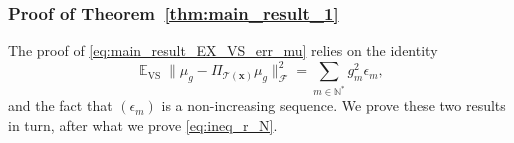 \documentclass[twoside,11pt]{book}
\numberwithin{theorem}{chapter}
\numberwithin{definition}{chapter}
\numberwithin{proposition}{chapter}
\numberwithin{corollary}{chapter}
\numberwithin{example}{chapter}
\numberwithin{lemma}{chapter}
\DeclareMathOperator{\VS}{\mathrm{VS}}
\DeclareMathOperator{\Tran}{\intercal}
\DeclareMathOperator{\EX}{\mathbb{E}}
\DeclareMathOperator{\F}{\mathcal{F}}
\DeclareMathOperator{\Ns}{\mathbb{N}^{*}}
\begin{document}

\subsubsection{Proof of Theorem~\ref{thm:main_result_1}}\label{app:proof_main_result_1}
The proof of \eqref{eq:main_result_EX_VS_err_mu} relies on the identity
\begin{equation}\label{eq:main_result_EX_VS_err_mu_2}
\EX_{\VS} \|\mu_{g} - \Pi_{\mathcal{T}(\bm{x})} \mu_{g}\|_{\F}^{2} = \sum\limits_{m \in \mathbb{N}^{*}} g_{m}^{2} \epsilon_{m},
\end{equation}
and the fact that $(\epsilon_{m})$ is a non-increasing sequence. We prove these two results in turn, after what we prove \eqref{eq:ineq_r_N}.
\end{document}
